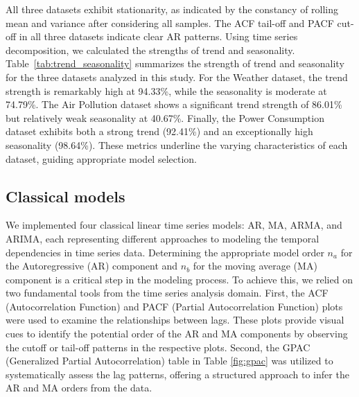 \documentclass{scrartcl}
\begin{document}
All three datasets exhibit stationarity, as indicated by the constancy of rolling mean and variance after considering all samples. The ACF tail-off and PACF cut-off in all three datasets indicate clear AR patterns. Using time series decomposition, we calculated the strengths of trend and seasonality. Table~\ref{tab:trend_seasonality} summarizes the strength of trend and seasonality for the three datasets analyzed in this study. For the Weather dataset, the trend strength is remarkably high at 94.33\%, while the seasonality is moderate at 74.79\%. The Air Pollution dataset shows a significant trend strength of 86.01\% but relatively weak seasonality at 40.67\%. Finally, the Power Consumption dataset exhibits both a strong trend (92.41\%) and an exceptionally high seasonality (98.64\%). These metrics underline the varying characteristics of each dataset, guiding appropriate model selection.



\subsection{Classical models}
We implemented four classical linear time series models: AR, MA, ARMA, and ARIMA, each representing different approaches to modeling the temporal dependencies in time series data. Determining the appropriate model order \(n_a\) for the Autoregressive (AR) component and \(n_b\) for the moving average (MA) component is a critical step in the modeling process. To achieve this, we relied on two fundamental tools from the time series analysis domain. First, the ACF (Autocorrelation Function) and PACF (Partial Autocorrelation Function) plots were used to examine the relationships between lags. These plots provide visual cues to identify the potential order of the AR and MA components by observing the cutoff or tail-off patterns in the respective plots. Second, the GPAC (Generalized Partial Autocorrelation) table in Table \ref{fig:gpac} was utilized to systematically assess the lag patterns, offering a structured approach to infer the AR and MA orders from the data.
\end{document}
